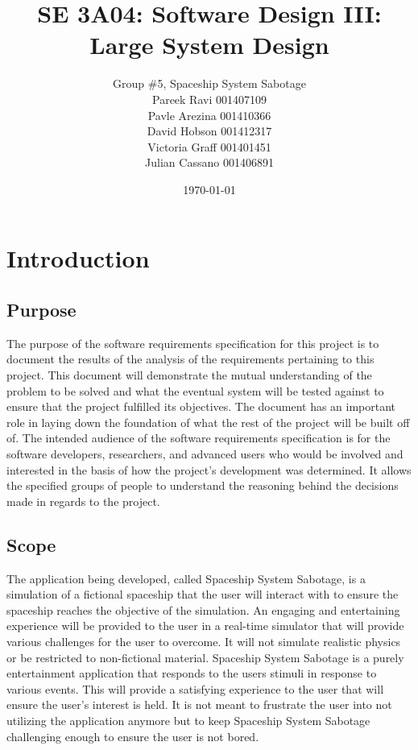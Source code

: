 \documentclass[12pt, titlepage]{article}
\title{SE 3A04: Software Design III: Large System Design}
\author{Group \#5, Spaceship System Sabotage %
		\\Pareek Ravi 001407109
		\\Pavle Arezina 001410366
		\\David Hobson 001412317
		\\Victoria Graff 001401451
		\\Julian Cassano 001406891
}
\date{\today}
\newcommand\tab[1][1cm]{\hspace*{#1}}
\begin{document}
\maketitle
{}
\tableofcontents
\listoftables

\newpage
{}

\section{Introduction}
\label{sec:introduction}


\subsection{Purpose}
\label{sub:purpose}
\tab The purpose of the software requirements specification for this project is to document the results of the analysis of the requirements pertaining to this project. This document will demonstrate the mutual understanding of the problem to be solved and what the eventual system will be tested against to ensure that the project fulfilled its objectives. The document has an important role in laying down the foundation of what the rest of the project will be built off of. The intended audience of the software requirements specification is for the software developers, researchers, and advanced users who would be involved and interested in the basis of how the project's development was determined. It allows the specified groups of people to understand the reasoning behind the decisions made in regards to the project.

\subsection{Scope}
\label{sub:scope}
\tab The application being developed, called Spaceship System Sabotage, is a simulation of a fictional spaceship that the user will interact with to ensure the spaceship reaches the objective of the simulation. An engaging and entertaining experience will be provided to the user in a real-time simulator that will provide various challenges for the user to overcome. It will not simulate realistic physics or be restricted to non-fictional material. Spaceship System Sabotage is a purely entertainment application that responds to the users stimuli in response to various events. This will provide a satisfying experience to the user that will ensure the user's interest is held. It is not meant to frustrate the user into not utilizing the application anymore but to keep Spaceship System Sabotage challenging enough to ensure the user is not bored.
\\\\\\\\\\\\\\\\\\\\
\end{document}
